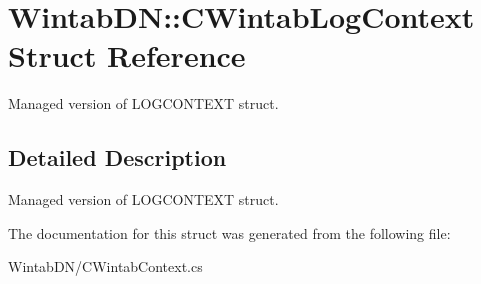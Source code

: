 \hypertarget{struct_wintab_d_n_1_1_c_wintab_log_context}{
\section{WintabDN::CWintabLogContext Struct Reference}
\label{struct_wintab_d_n_1_1_c_wintab_log_context}
}


Managed version of LOGCONTEXT struct.  




\subsection{Detailed Description}
Managed version of LOGCONTEXT struct. 

The documentation for this struct was generated from the following file:\begin{DoxyCompactItemize}
\item 
WintabDN/CWintabContext.cs\end{DoxyCompactItemize}
